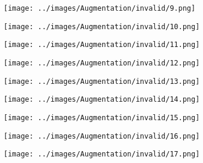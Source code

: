 \begin{figure}[H]
 \hspace{1em}%
 \begin{subfigure}[b]{0.1\textwidth}
   \centering
   \texttt{[image: ../images/Augmentation/invalid/9.png]}
 \end{subfigure}
 \hspace{1em}%
 \begin{subfigure}[b]{0.1\textwidth}
   \centering
   \texttt{[image: ../images/Augmentation/invalid/10.png]}
 \end{subfigure}
 \hspace{1em}%
 \begin{subfigure}[b]{0.1\textwidth}
   \centering
   \texttt{[image: ../images/Augmentation/invalid/11.png]}
 \end{subfigure}
 \hspace{1em}%
 \begin{subfigure}[b]{0.1\textwidth}
 \centering
 \texttt{[image: ../images/Augmentation/invalid/12.png]}
 \end{subfigure}
 \hspace{1em}%
 \begin{subfigure}[b]{0.1\textwidth}
   \centering
   \texttt{[image: ../images/Augmentation/invalid/13.png]}
 \end{subfigure}
 \hspace{1em}%
 \begin{subfigure}[b]{0.1\textwidth}
   \centering
   \texttt{[image: ../images/Augmentation/invalid/14.png]}
 \end{subfigure}
 \hspace{1em}%
 \begin{subfigure}[b]{0.1\textwidth}
   \centering
   \texttt{[image: ../images/Augmentation/invalid/15.png]}
 \end{subfigure}
 \hspace{1em}%
 \begin{subfigure}[b]{0.1\textwidth}
 \centering
 \texttt{[image: ../images/Augmentation/invalid/16.png]}
 \end{subfigure}
 \hspace{1em}%
 \begin{subfigure}[b]{0.1\textwidth}
 \centering
 \texttt{[image: ../images/Augmentation/invalid/17.png]}
\end{subfigure}
\hspace{1em}%
\begin{subfigure}[b]{0.1\textwidth}

\end{subfigure}
\end{figure}
